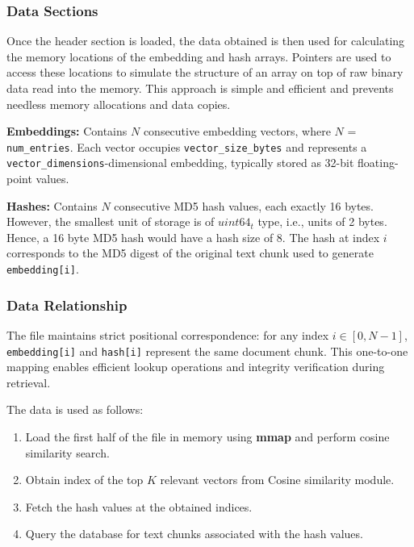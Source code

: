 \subsubsection{Data Sections}
\label{subsec:Vectordump_DataSections}
Once the header section is loaded, the data obtained is then used for calculating the memory locations of the embedding and hash arrays.
Pointers are used to access these locations to simulate the structure of an array on top of raw binary data read into the memory. This approach is simple and efficient and prevents needless memory allocations and data copies.

\textbf{Embeddings:} Contains $N$ consecutive embedding vectors, where $N$ = \texttt{num\_entries}. Each vector occupies \texttt{vector\_size\_bytes} and represents a \texttt{vector\_dimensions}-dimensional embedding, typically stored as 32-bit floating-point values.

\textbf{Hashes:} Contains $N$ consecutive MD5 hash values, each exactly 16 bytes. However, the smallest unit of storage is of $uint64_t$ type, i.e., units of 2 bytes. Hence, a 16 byte MD5 hash would have a hash size of 8. The hash at index $i$ corresponds to the MD5 digest of the original text chunk used to generate \texttt{embedding[i]}.


\subsubsection{Data Relationship}
\label{subsec:Vectordump_DataRelationship}

The file maintains strict positional correspondence: for any index $i \in [0, N-1]$, \texttt{embedding[i]} and \texttt{hash[i]} represent the same document chunk. This one-to-one mapping enables efficient lookup operations and integrity verification during retrieval.

The data is used as follows:
\begin{enumerate}[label=\arabic*.]
\item Load the first half of the file in memory using \textbf{mmap} and perform cosine similarity search.
    \item Obtain index of the top $K$ relevant vectors from Cosine similarity module.
    \item Fetch the hash values at the obtained indices.
    \item Query the database for text chunks associated with the hash values.
\end{enumerate}
    
